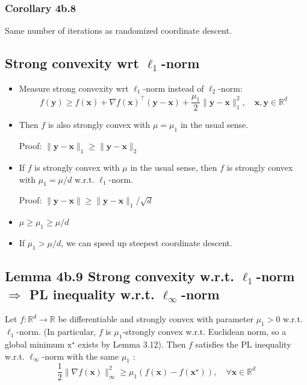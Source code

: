 \subsubsection*{Corollary 4b.8}
Same number of iterations as randomized coordinate descent.






\subsection*{Strong convexity wrt $\ell_{1}$-norm}
\begin{itemize}[leftmargin=*]
    \item Measure strong convexity wrt $\ell_{1}$-norm instead of $\ell_{2}$-norm:
$$
f(\mathbf{y}) \geq f(\mathbf{x})+\nabla f(\mathbf{x})^{\top}(\mathbf{y}-\mathbf{x})+\frac{\mu_{1}}{2}\|\mathbf{y}-\mathbf{x}\|_{1}^{2}, \quad \mathbf{x}, \mathbf{y} \in \mathbb{R}^{d}
$$
    \item Then $f$ is also strongly convex with $\mu=\mu_{1}$ in the usual sense.
    
        Proof: $\|\mathbf{y}-\mathbf{x}\|_{1} \geq\|\mathbf{y}-\mathbf{x}\|_2$
    \item If $f$ is strongly convex with $\mu$ in the usual sense, then $f$ is strongly convex with $\mu_{1}=\mu / d$ w.r.t. $\ell_{1}$-norm.
    
Proof: $\|\mathbf{y}-\mathbf{x}\| \geq\|\mathbf{y}-\mathbf{x}\|_{1} / \sqrt{d}$
    \item $\mu \geq \mu_{1} \geq \mu / d$
    \item If $\mu_{1}>\mu / d$, we can speed up steepest coordinate descent.
\end{itemize}






\subsection*{Lemma 4b.9 Strong convexity w.r.t. $\ell_{1}$-norm $\Rightarrow$ PL inequality w.r.t. $\ell_{\infty}$-norm}
Let $f: \mathbb{R}^{d} \rightarrow \mathbb{R}$ be differentiable and strongly convex with parameter $\mu_{1}>0$ w.r.t. $\ell_{1}$-norm. (In particular, $f$ is $\mu_{1}$-strongly convex w.r.t. Euclidean norm, so a global minimum $\mathrm{x}^{\star}$ exists by Lemma 3.12). Then $f$ satisfies the $\mathrm{PL}$ inequality w.r.t. $\ell_{\infty}$-norm with the same $\mu_{1}$ :
$$
\frac{1}{2}\|\nabla f(\mathbf{x})\|_{\infty}^{2} \geq \mu_{1}\left(f(\mathbf{x})-f\left(\mathbf{x}^{\star}\right)\right), \quad \forall \mathbf{x} \in \mathbb{R}^{d}
$$







